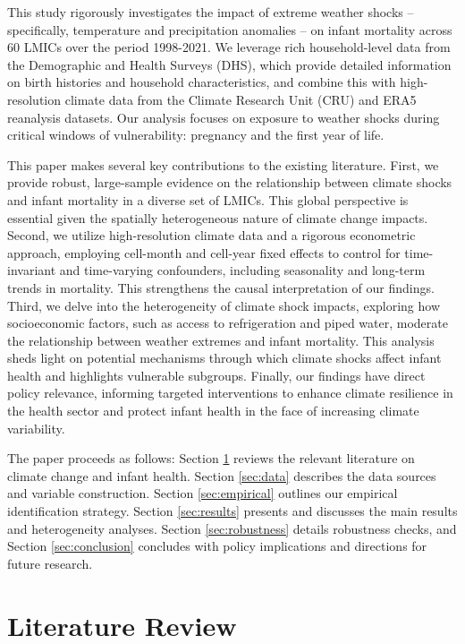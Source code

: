 \documentclass[12pt]{article}
\begin{document}
This study rigorously investigates the impact of extreme weather shocks – specifically, temperature and precipitation anomalies – on infant mortality across 60 LMICs over the period 1998-2021. We leverage rich household-level data from the Demographic and Health Surveys (DHS), which provide detailed information on birth histories and household characteristics, and combine this with high-resolution climate data from the Climate Research Unit (CRU) and ERA5 reanalysis datasets.  Our analysis focuses on exposure to weather shocks during critical windows of vulnerability: pregnancy and the first year of life.

This paper makes several key contributions to the existing literature. First, we provide robust, large-sample evidence on the relationship between climate shocks and infant mortality in a diverse set of LMICs.  This global perspective is essential given the spatially heterogeneous nature of climate change impacts. Second, we utilize high-resolution climate data and a rigorous econometric approach, employing cell-month and cell-year fixed effects to control for time-invariant and time-varying confounders, including seasonality and long-term trends in mortality.  This strengthens the causal interpretation of our findings. Third, we delve into the heterogeneity of climate shock impacts, exploring how socioeconomic factors, such as access to refrigeration and piped water, moderate the relationship between weather extremes and infant mortality.  This analysis sheds light on potential mechanisms through which climate shocks affect infant health and highlights vulnerable subgroups. Finally, our findings have direct policy relevance, informing targeted interventions to enhance climate resilience in the health sector and protect infant health in the face of increasing climate variability.

The paper proceeds as follows: Section \ref{sec:litreview} reviews the relevant literature on climate change and infant health. Section \ref{sec:data} describes the data sources and variable construction. Section \ref{sec:empirical} outlines our empirical identification strategy. Section \ref{sec:results} presents and discusses the main results and heterogeneity analyses. Section \ref{sec:robustness} details robustness checks, and Section \ref{sec:conclusion} concludes with policy implications and directions for future research.

\section{Literature Review} \label{sec:litreview}
\end{document}
